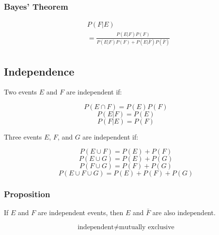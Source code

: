 \subsubsection{Bayes' Theorem}

\begin{align*}
     & P(F|E)                                                   \\
     & = \frac{P(E|F)P(F)}{P(E|F)P(F) + P(E|\bar{F})P(\bar{F})} \\
\end{align*}

\subsection{Independence}

Two events $E$ and $F$ are independent if:

$$ P(E \cap F) = P(E)P(F) $$
$$ P(E|F) = P(E) $$
$$ P(F|E) = P(F) $$

Three events $E$, $F$, and $G$ are independent if:

$$ P(E \cup F) = P(E) + P(F) $$
$$ P(E \cup G) = P(E) + P(G) $$
$$ P(F \cup G) = P(F) + P(G) $$
$$ P(E \cup F \cup G) = P(E) + P(F) + P(G) $$

\subsubsection{Proposition}

If $E$ and $F$ are independent events, then $E$ and $\bar{F}$ are also independent.

$$ \text{independent} \neq \text{mutually exclusive} $$